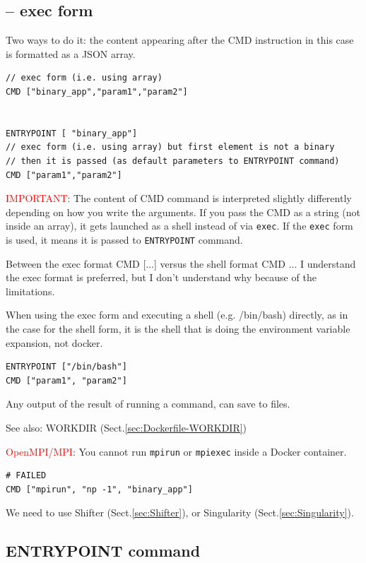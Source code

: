 \subsection{-- exec form}

Two ways to do it: the content appearing after the CMD instruction in this case is formatted as a JSON array.
\begin{verbatim}
// exec form (i.e. using array)
CMD ["binary_app","param1","param2"]


ENTRYPOINT [ "binary_app"]
// exec form (i.e. using array) but first element is not a binary
// then it is passed (as default parameters to ENTRYPOINT command)
CMD ["param1","param2"] 

\end{verbatim}

\textcolor{red}{IMPORTANT}: The content of CMD command is interpreted slightly
differently depending on how you write the arguments. If you pass the CMD as a
string (not inside an array), it gets launched as a shell instead of via
\verb!exec!. If the \verb!exec! form is used, it means it is passed to
\verb!ENTRYPOINT! command.


Between the exec format CMD [...] versus the shell format CMD ... I understand
the exec format is preferred, but I don't understand why because of the
limitations.

When using the exec form and executing a shell (e.g. /bin/bash)  directly, as in
the case for the shell form, it is the shell that is doing the environment
variable expansion, not docker.
\begin{verbatim}
ENTRYPOINT ["/bin/bash"]
CMD ["param1", "param2"]
\end{verbatim}

Any output of the result of running a command, can save to files.


See also: WORKDIR (Sect.\ref{sec:Dockerfile-WORKDIR})


\textcolor{red}{OpenMPI/MPI}: You cannot run \verb!mpirun! or \verb!mpiexec! inside a Docker container. 
\begin{verbatim}
# FAILED
CMD ["mpirun", "np -1", "binary_app"]
\end{verbatim}
We need to use Shifter (Sect.\ref{sec:Shifter}), or Singularity (Sect.\ref{sec:Singularity}).


\subsection{ENTRYPOINT command}
\label{sec:Dockerfile-ENTRYPOINT}

